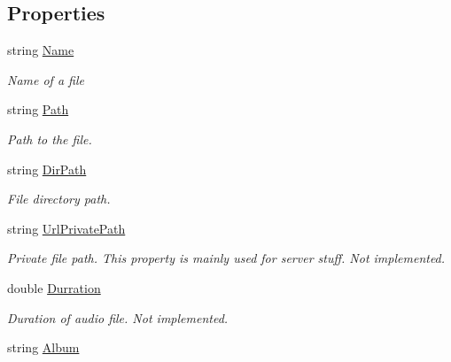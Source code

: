 \subsection*{Properties}
\begin{DoxyCompactItemize}
\item 
string \mbox{\hyperlink{classOSML_1_1Media_1_1AudioData_acd6074243ec8166e541d2bd40450b8a3}{Name}}
\begin{DoxyCompactList}\small\item\em Name of a file \end{DoxyCompactList}\item 
string \mbox{\hyperlink{classOSML_1_1Media_1_1AudioData_a4c1949eea038a489ab3698b5839efafc}{Path}}
\begin{DoxyCompactList}\small\item\em Path to the file. \end{DoxyCompactList}\item 
string \mbox{\hyperlink{classOSML_1_1Media_1_1AudioData_ad8d515bb10d879d14ccb37a47235cd26}{Dir\+Path}}
\begin{DoxyCompactList}\small\item\em File directory path. \end{DoxyCompactList}\item 
string \mbox{\hyperlink{classOSML_1_1Media_1_1AudioData_a48bfa684786ec62d847bdbf41d1c557c}{Url\+Private\+Path}}
\begin{DoxyCompactList}\small\item\em Private file path. This property is mainly used for server stuff. Not implemented. \end{DoxyCompactList}\item 
double \mbox{\hyperlink{classOSML_1_1Media_1_1AudioData_a3072a1671912775f605f93706bc7f55b}{Durration}}
\begin{DoxyCompactList}\small\item\em Duration of audio file. Not implemented. \end{DoxyCompactList}\item 
string \mbox{\hyperlink{classOSML_1_1Media_1_1AudioData_a6163961b47a1734a688ab63d39fd7e1a}{Album}}

\end{DoxyCompactItemize}
